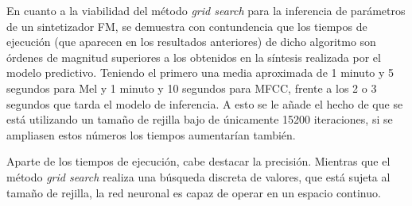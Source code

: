 En cuanto a la viabilidad del método \textit{grid search} para la inferencia de parámetros de un sintetizador FM,
se demuestra con contundencia que los tiempos de ejecución (que aparecen en los resultados anteriores) de dicho algoritmo
son órdenes de magnitud superiores a los obtenidos en la síntesis realizada por el modelo predictivo. Teniendo el primero 
una media aproximada de 1 minuto y 5 segundos para Mel y 1 minuto y 10 segundos para MFCC, frente a los 2 o 3 segundos
que tarda el modelo de inferencia. A esto se le añade el hecho de que se está utilizando un tamaño de rejilla bajo 
de únicamente 15200 iteraciones, si se ampliasen estos números los tiempos aumentarían también.

Aparte de los tiempos de ejecución, cabe destacar la precisión. Mientras que el método \textit{grid search} realiza una 
búsqueda discreta de valores, que está sujeta al tamaño de rejilla, la red neuronal es capaz de operar en un espacio continuo.

